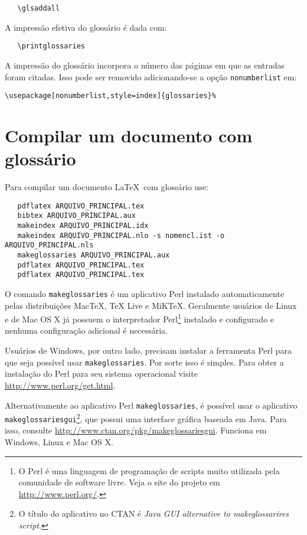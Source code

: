 \documentclass[
    12pt,				%
    openright,			%
    twoside,			%
    a4paper,			%
    english,			%
    french,				%
    spanish,			%
    brazil				%
    ]{abntex2}
\begin{document}
\begin{verbatim}
   \glsaddall
\end{verbatim}
 
A impressão efetiva do glossário é dada com:

\begin{verbatim}
   \printglossaries
\end{verbatim}

A impressão do glossário incorpora o número das páginas em que as entradas foram
citadas. Isso pode ser removido adicionando-se a opção \texttt{nonumberlist} em:

\begin{verbatim}
\usepackage[nonumberlist,style=index]{glossaries}%
\end{verbatim}

\section{Compilar um documento com glossário}
\label{sec-compilar-glossario}
 
Para compilar um documento \LaTeX\ com glossário use:

\begin{verbatim}
   pdflatex ARQUIVO_PRINCIPAL.tex
   bibtex ARQUIVO_PRINCIPAL.aux
   makeindex ARQUIVO_PRINCIPAL.idx 
   makeindex ARQUIVO_PRINCIPAL.nlo -s nomencl.ist -o ARQUIVO_PRINCIPAL.nls
   makeglossaries ARQUIVO_PRINCIPAL.aux
   pdflatex ARQUIVO_PRINCIPAL.tex
   pdflatex ARQUIVO_PRINCIPAL.tex
\end{verbatim}
 
O comando \texttt{makeglossaries} é um aplicativo Perl instalado
automaticamente pelas distribuições MacTeX, TeX Live e MiKTeX. Geralmente
usuários de Linux e de Mac OS X já possuem o interpretador Perl\footnote{O Perl
é uma linguagem de programação de scripts muito utilizada pela comunidade de
software livre. Veja o site do projeto em \url{http://www.perl.org/}.} instalado
e configurado e nenhuma configuração adicional é necessária.

Usuários de Windows, por outro lado, precisam instalar a ferramenta Perl para
que seja possível usar \texttt{makeglossaries}. Por sorte isso é simples. Para
obter a instalação do Perl para seu sistema operacional visite \url{http://www.perl.org/get.html}.

Alternativamente ao aplicativo Perl \texttt{makeglossaries}, é possível usar o
aplicativo \texttt{makeglossariesgui}\footnote{O título do aplicativo no CTAN
é \textit{Java GUI alternative to makeglossarires script}.}, que possui uma
interface gráfica baseada em Java. Para isso, consulte
\url{http://www.ctan.org/pkg/makeglossariesgui}. Funciona em Windows,
Linux e Mac OS X.
\end{document}
